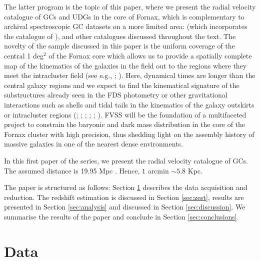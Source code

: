 \documentclass[useAMS,usenatbib]{mn2e}
\begin{document}
The latter program is the topic of this paper, where we present the radial 
velocity catalogue of GCs and UDGs in the core of Fornax, which is 
complementary to archival spectroscopic GC datasets on a more limited area: 
\citet{Schuberth} (which incorporates the catalogue of \citealt{Dirsch04}), 
\citet{Bergond07} and other catalogues discussed throughout the 
text. The novelty of the sample discussed in this paper is the uniform coverage 
of the central 1 deg$^2$ of the Fornax core which allows us to provide a 
spatially complete map of the kinematics of the galaxies in the field out to 
the regions where they meet the intracluster field (see e.g., \citealt{napolitano03}; 
\citealt{arnaboldi12}). Here, dynamical times are longer than the central 
galaxy regions and we expect to find the kinematical signature of the 
substructures already seen in the FDS photometry \citep{Iodice16} or other 
gravitational interactions such as shells and tidal tails in the kinematics of 
the galaxy outskirts or intracluster regions (\citealt{napolitano02,napolitano03}; 
\citealt{murante07}; \citealt{bullock05}; \citealt{rudick06}; 
\citealt{duc11}; \citealt{Longobardi15}). FVSS will be 
the foundation of a multifaceted project to constrain the baryonic and dark 
mass distribution in the core of the Fornax cluster with high precision, thus 
shedding light on the assembly history of massive galaxies in one of the 
nearest dense environments.

In this first paper of the series, we present the radial velocity catalogue of 
GCs. 
The assumed distance is 19.95 Mpc \citep{Tonry01}. Hence, $1$ arcmin $\sim 5.8$ Kpc.

The paper is structured as follows: Section \ref{sec:data} describes the data 
acquisition and reduction. The redshift estimation is discussed in Section 
\ref{sec:zest}, results are presented in Section \ref{sec:analysis} and 
discussed in Section \ref{sec:discussion}. We summarise the results of the paper and 
conclude in Section \ref{sec:conclusions}. 

\section{Data}
\label{sec:data}
\end{document}
